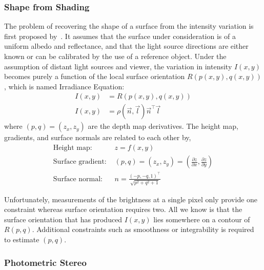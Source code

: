 \subsubsection{Shape from Shading}
The problem of recovering the shape of a surface from the intensity variation is first proposed by~\citeauthor{horn1989shape}. It assumes that the surface under consideration is of a uniform albedo and reflectance, and that the light source directions are either known or can be calibrated by the use of a reference object. Under the assumption of distant light sources and viewer, the variation in intensity $I(x,y)$ becomes purely a function of the local surface orientation $R(p(x, y), q(x, y))$, which is named Irradiance Equation:
\begin{align*}
I(x, y) &= R(p(x, y), q(x, y))\\
I(x, y) &= \rho(\vec{n},\vec{l})\vec{n}^\top\vec{l}
\end{align*}
where $(p, q) = (z_x, z_y)$ are the depth map derivatives. The height map, gradients, and surface normals are related to each other by,
\begin{align*}
\text{Height map: } & z=f(x,y)\\
\text{Surface gradient: } & (p,q)=(z_x,z_y)=(\frac{\partial z}{\partial x}, \frac{\partial z}{\partial y})\\
\text{Surface normal: } & n = \frac{(-p, -q, 1)^\top}{\sqrt{p^2+q^2+1}}
\end{align*}

Unfortunately, measurements of the brightness at a single pixel only provide one constraint whereas surface orientation requires two. All we know is that the surface orientation that has produced $I(x, y)$ lies somewhere on a contour of $R(p, q)$. Additional constraints such as smoothness or integrability is required to estimate $(p, q)$.

\subsubsection{Photometric Stereo}

